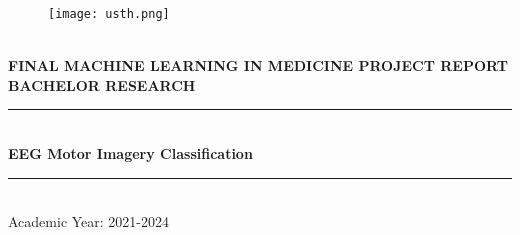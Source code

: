 \documentclass[]{report}
\begin{document}
\begin{titlepage}
\begin{center}
\begin{figure}
    \centering
    \texttt{[image: usth.png]}
\end{figure}



\textsc{\Large }\\[1.5cm]
{\large \bfseries FINAL MACHINE LEARNING IN MEDICINE PROJECT REPORT}\\[0.4cm]

{\huge \bfseries \uppercase{Bachelor Research} \\[3cm] }


\rule{\linewidth}{0.3mm} \\[0.4cm]
{ \Huge \bfseries\color{blue} EEG Motor Imagery  Classification\\[0.4cm] }
\rule{\linewidth}{0.3mm} \\[0.5cm]
\large Academic Year: 2021-2024

    
    
\end{center}
\end{titlepage}
\end{document}
